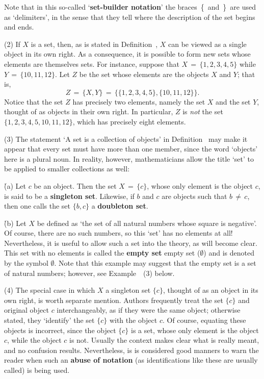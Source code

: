         Note that in this so-called `{\bf set-builder notation}'
    the braces \,\{\, and \,\}\, are used as `delimiters', in the sense that they tell where the description of the set begins and ends.

\V

        (2) If $X$ is a set, then, as is stated in Definition~, $X$ can be viewed as a single object in its own right.
    As a consequence, it is possible to form new sets whose elements are themselves sets.
    For instance, suppose that $X \,=\, \{1,2,3,4,5\}$ while $Y \,=\, \{10, 11, 12\}$.
    Let $Z$ be the set whose elements are the objects $X$ and $Y$;
    that is,
        \begin{displaymath}
        Z \,=\, \{X,Y\} \,=\, \{\{1,2,3,4,5\},\{10,11,12\}\}.
        \end{displaymath}
    Notice that the set $Z$ has precisely two elements, namely the set $X$ and the set $Y$, thought of as objects in their own right.
    In particular, $Z$ is {\em not} the set $\{1,2,3,4,5,10,11,12\}$, which has precisely eight elements.

\V

        (3) The statement `A set is a collection of objects' in Definition~
    may make it appear that every set must have more than one member, since the word `objects' here is a plural noun.
    In reality, however, mathematicians allow the title `set' to be applied to smaller collections as well:

       \h (a) Let $c$ be an object. Then the set $X \,=\, \{c\}$, whose only element is the object $c$, is said to be a {\bf singleton set}.
    Likewise, if $b$ and $c$ are objects such that $b\,{\neq}\,c$, then one calls the set $\{b,c\}$ a {\bf doubleton set}.

       \h (b) Let $X$ be defined as `the set of all natural numbers whose square is negative'.
    Of course, there are no such numbers, so this `set' has no elements at all!
    Nevertheless, it is useful to allow such a set into the theory, as will become clear.
    This set with no elements is called the {\bf empty set} {empty set (${\emptyset}$)} and is denoted by the symbol ${\emptyset}$.
    Note that this example may suggest that the empty set is a set of natural numbers; however, see Example~~(3) below.

\V


        (4) The special case in which $X$ a singleton set $\{c\}$, thought of as an object in its own right, is worth separate mention.
    Authors frequently treat the set $\{c\}$ and original object $c$ interchangeably,
    as if they were the same object; otherwise stated, they `identify' the set $\{c\}$ with the object $c$.
    Of course, equating these objects is incorrect, since the object $\{c\}$ is a set, whose only element is the object $c$, while the object $c$ is not.
    Usually the context makes clear what is really meant, and no confusion results.
    Nevertheless, is is considered good manners to warn the reader when such an {\bf abuse of notation}
    (as identifications like these are usually called) is being used.

